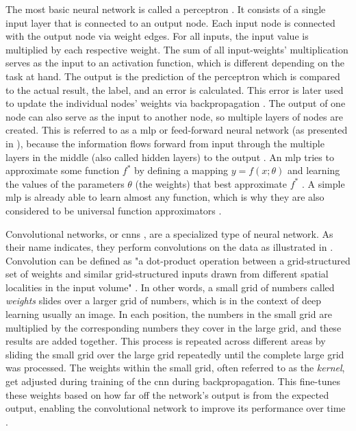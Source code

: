 The most basic neural network is called a perceptron  \cite{rosenblatt1958PerceptronProbabilisticModel}.
It consists of a single input layer that is connected to an output node.
Each input node is connected with the output node via weight edges.
For all inputs, the input value is multiplied by each respective weight.
The sum of all input-weights' multiplication serves as the input to an activation function, which is different depending on the task at hand.
The output is the prediction of the perceptron which is compared to the actual result, the label, and an error is calculated.
This error is later used to update the individual nodes' weights via backpropagation \cite{aggarwal2018NeuralNetworksDeep}.
The output of one node can also serve as the input to another node, so multiple layers of nodes are created.
This is referred to as a \gls{mlp} or feed-forward neural network (as presented in ), 
because the information flows forward from input through the multiple layers in the middle (also called hidden layers) to the output \cite{aggarwal2018NeuralNetworksDeep, Goodfellow-et-al-2016}.
An \gls{mlp} tries to approximate some function $f^*$ by defining a mapping $y=f(x;\theta)$ and learning the values of the parameters $\theta$ (\ie the weights) that best approximate $f^*$ \cite{Goodfellow-et-al-2016}.
A simple \gls{mlp} is already able to learn almost any function, which is why they are also considered to be universal function approximators \cite{aggarwal2018NeuralNetworksDeep, hornik1989MultilayerFeedforwardNetworks}.

Convolutional networks, or \glspl{cnn} \cite{lecun1998GradientbasedLearningApplied}, are a specialized type of neural network.
As their name indicates, they perform convolutions on the data as illustrated in .
Convolution can be defined as "a dot-product operation between a grid-structured set of weights and similar grid-structured inputs drawn from
different spatial localities in the input volume" \cite[p. 316]{aggarwal2018NeuralNetworksDeep}.
In other words, a small grid of numbers called \textit{weights} slides over a larger grid of numbers, which is in the context of deep learning usually an image.
In each position, the numbers in the small grid are multiplied by the corresponding numbers they cover in the large grid, and these results are added together. 
This process is repeated across different areas by sliding the small grid over the large grid repeatedly until the complete large grid was processed.
The weights within the small grid, often referred to as the \textit{kernel}, get adjusted during training of the \gls{cnn} during backpropagation. 
This fine-tunes these weights based on how far off the network's output is from the expected output, enabling the convolutional network to improve its performance over time \cite{aggarwal2018NeuralNetworksDeep, Goodfellow-et-al-2016}.


